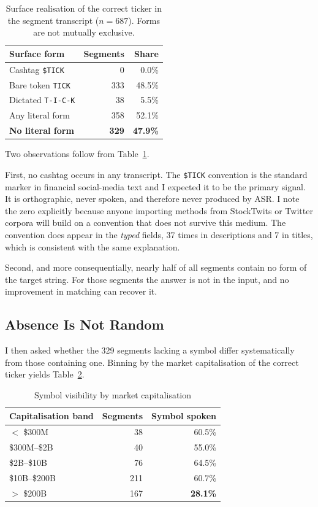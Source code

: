 \documentclass[conference]{IEEEtran}
\begin{document}
\begin{table}[htbp]
\caption{Surface realisation of the correct ticker in the segment transcript
($n = 687$). Forms are not mutually exclusive.}
\label{tab:surface}
\centering
\begin{tabular}{lrr}
\toprule
Surface form & Segments & Share \\
\midrule
Cashtag \texttt{\$TICK} & 0 & 0.0\% \\
Bare token \texttt{TICK} & 333 & 48.5\% \\
Dictated \texttt{T-I-C-K} & 38 & 5.5\% \\
\midrule
Any literal form & 358 & 52.1\% \\
\textbf{No literal form} & \textbf{329} & \textbf{47.9\%} \\
\bottomrule
\end{tabular}
\end{table}

Two observations follow from Table~\ref{tab:surface}.

First, no cashtag occurs in any transcript. The \texttt{\$TICK} convention is
the standard marker in financial social-media text and I expected it to be the
primary signal. It is orthographic, never spoken, and therefore never produced
by ASR. I note the zero explicitly because anyone importing methods from
StockTwits or Twitter corpora will build on a convention that does not survive
this medium. The convention does appear in the \emph{typed} fields, 37 times in
descriptions and 7 in titles, which is consistent with the same explanation.

Second, and more consequentially, nearly half of all segments contain no form of
the target string. For those segments the answer is not in the input, and no
improvement in matching can recover it.

\subsection{Absence Is Not Random}
\label{sec:inversion}

I then asked whether the 329 segments lacking a symbol differ systematically
from those containing one. Binning by the market capitalisation of the correct
ticker yields Table~\ref{tab:cap}.

\begin{table}[htbp]
\caption{Symbol visibility by market capitalisation}
\label{tab:cap}
\centering
\begin{tabular}{lrr}
\toprule
Capitalisation band & Segments & Symbol spoken \\
\midrule
$<$ \$300M & 38 & 60.5\% \\
\$300M--\$2B & 40 & 55.0\% \\
\$2B--\$10B & 76 & 64.5\% \\
\$10B--\$200B & 211 & 60.7\% \\
$>$ \$200B & 167 & \textbf{28.1\%} \\
\bottomrule
\end{tabular}
\end{table}
\end{document}
